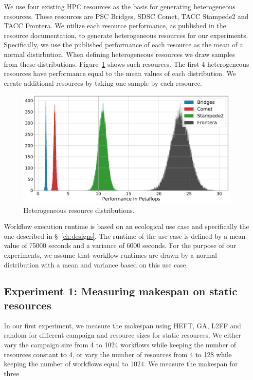 We use four existing HPC resources as the basis for generating heterogeneous resources.
These resources are PSC Bridges, SDSC Comet, TACC Stampede2 and TACC Frontera.
We utilize each resource performance, as published in the resource documentation, to generate heterogeneous resources for our experiments.
Specifically, we use the published performance of each resource as the mean of a normal distirbution.
When defining heterogeneous resources we draw samples from these distributions.
Figure~\ref{fig:heter_res} shows such resources.
The first 4 heterogeneous resources have performance equal to the mean values of each distribution.
We create additional resources by taking one sample by each resource.

\begin{figure}[ht!]
    \centering
    \includegraphics[width=.95\textwidth]{figures/campaign/hetero_res.pdf}
    \caption{Heterogeneous resource distributions.}
    \label{fig:heter_res}
\end{figure}

Workflow execution runtime is based on an ecological use case and specifically the one described in \S~\ref{ch:designs}.
The runtime of the use case is defined by a mean value of 75000 seconds and a variance of 6000 seconds.
For the purpose of our experiments, we assume that workflow runtimes are drawn by a normal distribution with a mean and variance based on this use case.

\subsection{Experiment 1: Measuring makespan on static resources}

In our first experiment, we measure the makespan using HEFT, GA, L2FF and random for different campaign and resource sizes for static resources.
We either vary the campaign size from 4 to 1024 workflows while keeping the number of resources constant to 4, or vary the number of resources from 4 to 128 while keeping the number of workflows equal to 1024.
We measure the makespan for three 

